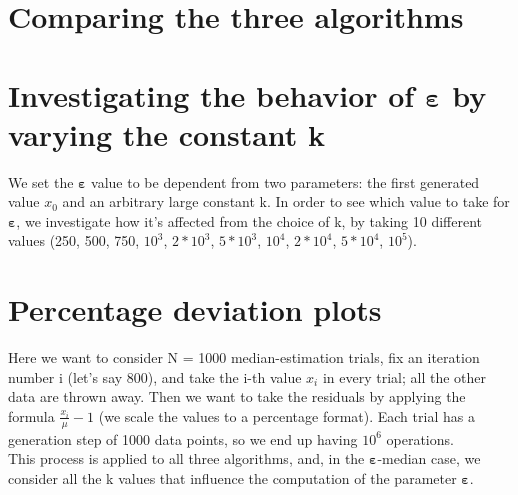 \documentclass[paper=a4wide, fontsize=12pt]{scrartcl}	 %
\begin{document}
\section*{Comparing the three algorithms}


\section*{Investigating the behavior of $\mathbf{\varepsilon}$ by varying the constant k}
We set the $\mathbf{\varepsilon}$ value to be dependent from two parameters: the first generated value $x_0$ and an arbitrary large constant k.
In order to see which value to take for $\mathbf{\varepsilon}$, we investigate how it's affected from the choice of k, by taking 10 different values (250, 500, 750, $10^3$, $2*10^3$, $5*10^3$, $10^4$, $2*10^4$, $5*10^4$, $10^5$). %


\section*{Percentage deviation plots}
Here we want to consider N = 1000 median-estimation trials, fix an iteration number i (let's say 800), and take the i-th value $x_i$ in every trial; all the other data are thrown away.
Then we want to take the residuals by applying the formula $\frac{x_i}{\mu} - 1$ (we scale the values to a percentage format). 
Each trial has a generation step of 1000 data points, so we end up having $10^6$ operations.\\
This process is applied to all three algorithms, and, in the $\mathbf{\varepsilon}$-median case, we consider all the k values that influence the computation of the parameter $\mathbf{\varepsilon}$.
\end{document}
